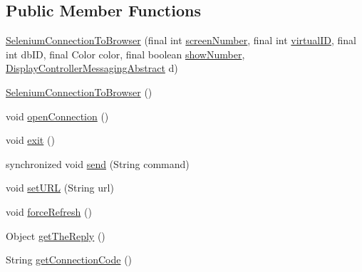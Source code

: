 \subsection*{Public Member Functions}
\begin{DoxyCompactItemize}
\item 
\hyperlink{classgov_1_1fnal_1_1ppd_1_1dd_1_1display_1_1client_1_1selenium_1_1SeleniumConnectionToBrowser_abc7adbb4c853afb84ed97538afe63483}{Selenium\-Connection\-To\-Browser} (final int \hyperlink{classgov_1_1fnal_1_1ppd_1_1dd_1_1display_1_1client_1_1ConnectionToBrowserInstance_a987b6e9010a2a8638689aae316cd0063}{screen\-Number}, final int \hyperlink{classgov_1_1fnal_1_1ppd_1_1dd_1_1display_1_1client_1_1ConnectionToBrowserInstance_a46edc5a7bac5d819516ff0092d7478e8}{virtual\-I\-D}, final int db\-I\-D, final Color color, final boolean \hyperlink{classgov_1_1fnal_1_1ppd_1_1dd_1_1display_1_1client_1_1ConnectionToBrowserInstance_a2f2ffa53ac708358dde068e9e3b282ba}{show\-Number}, \hyperlink{classgov_1_1fnal_1_1ppd_1_1dd_1_1display_1_1client_1_1DisplayControllerMessagingAbstract}{Display\-Controller\-Messaging\-Abstract} d)
\item 
\hyperlink{classgov_1_1fnal_1_1ppd_1_1dd_1_1display_1_1client_1_1selenium_1_1SeleniumConnectionToBrowser_a60849cac75b4a49f0ee042fdd49fce7d}{Selenium\-Connection\-To\-Browser} ()
\item 
void \hyperlink{classgov_1_1fnal_1_1ppd_1_1dd_1_1display_1_1client_1_1selenium_1_1SeleniumConnectionToBrowser_ad8d8990b0efc906bcf484f929fb52dea}{open\-Connection} ()
\item 
void \hyperlink{classgov_1_1fnal_1_1ppd_1_1dd_1_1display_1_1client_1_1selenium_1_1SeleniumConnectionToBrowser_ac289ed7c08bcf22fe88cbd1e49a9ce6a}{exit} ()
\item 
synchronized void \hyperlink{classgov_1_1fnal_1_1ppd_1_1dd_1_1display_1_1client_1_1selenium_1_1SeleniumConnectionToBrowser_a120575551e9b61673195a011d131ef51}{send} (String command)
\item 
void \hyperlink{classgov_1_1fnal_1_1ppd_1_1dd_1_1display_1_1client_1_1selenium_1_1SeleniumConnectionToBrowser_a0efbaa6634b0b6ed135d1a66b2d19bae}{set\-U\-R\-L} (String url)
\item 
void \hyperlink{classgov_1_1fnal_1_1ppd_1_1dd_1_1display_1_1client_1_1selenium_1_1SeleniumConnectionToBrowser_a7798d1132c4890b4918766200f69c325}{force\-Refresh} ()
\item 
Object \hyperlink{classgov_1_1fnal_1_1ppd_1_1dd_1_1display_1_1client_1_1selenium_1_1SeleniumConnectionToBrowser_aa84016c2869e64d30921b02a1262f997}{get\-The\-Reply} ()
\item 
String \hyperlink{classgov_1_1fnal_1_1ppd_1_1dd_1_1display_1_1client_1_1selenium_1_1SeleniumConnectionToBrowser_a9afb54c8a29bfc01a8a20d3675770389}{get\-Connection\-Code} ()
\end{DoxyCompactItemize}
